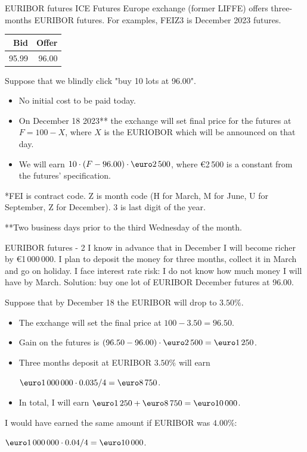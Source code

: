 \documentclass{beamer}
\renewcommand{\EUR}[1]{\textup{\euro}#1}
\begin{document}
\begin{frame}{EURIBOR futures}
\justify
ICE Futures Europe exchange (former LIFFE) offers three-months EURIBOR futures. For examples, \alert{FEIZ3} is December 2023 futures.

\justify
\centering
\begin{tabular}{r|r}
Bid & Offer \\ \hline
95.99 & 96.00
\end{tabular}

\justify
Suppose that we blindly click "buy 10 lots at 96.00".
\begin{itemize}
\justifying
\item No initial cost to be paid today.
\item On December 18 2023** the exchange will set final price for the futures at $F = 100 - X$, where 
$X$ is the EURIOBOR which will be announced on that day.
\item We will earn $10 \cdot (F - 96.00) \cdot \EUR{2\,500}$, where \EUR{2\,500} is a constant from the futures' specification.
\end{itemize}

\justify
*FEI is contract code. Z is month code (H for March, M for June, U for September, Z for December). 3 is last digit of the year.

\justify
**Two business days prior to the third Wednesday of the month.
\end{frame}



\begin{frame}{EURIBOR futures - 2}
\justify
I know in advance that in December I will become richer by \EUR{1\,000\,000}. I plan to deposit the money for three months, collect it in March and go on holiday. I face \alert{interest rate risk}: I do not know how  much money I will have by March.
\justify
Solution: buy one lot of EURIBOR December futures at 96.00.

\justify
Suppose that by December 18 the EURIBOR will drop to $3.50\%$.
\begin{itemize}
\justifying
\item The exchange will set the final price at $100 - 3.50 = 96.50$.
\item Gain on the futures is $(96.50-96.00)\cdot\EUR{2\,500} = \EUR{1\,250}$.
\item Three months deposit at EURIBOR $3.50\%$ will earn

$\EUR{1\,000\,000} \cdot 0.035 / 4 = \EUR{8\,750}$.
\item In total, I will earn $\EUR{1\,250} + \EUR{8\,750} = \EUR{10\,000}$.
\end{itemize} 

\justify
I would have earned the same amount if EURIBOR was $4.00\%$:

$\EUR{1\,000\,000} \cdot 0.04/4 =\EUR{10\,000}$.
\end{frame}
\end{document}
